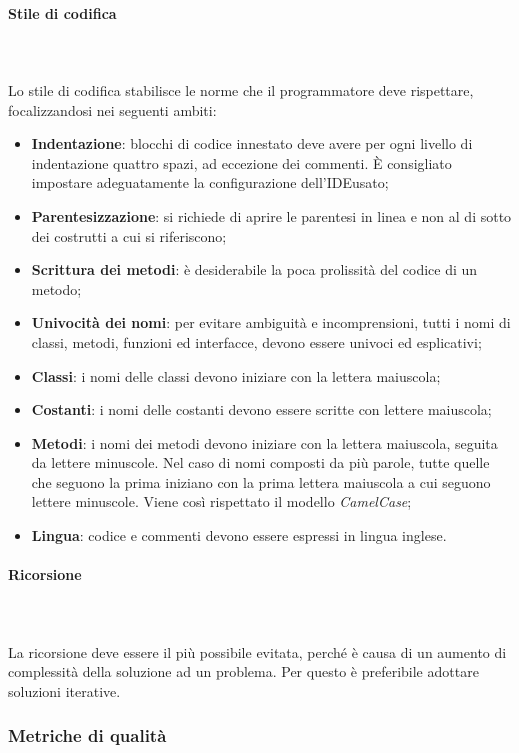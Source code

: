 		\paragraph{Stile di codifica} \mbox{} \\ \mbox{} \\
		Lo stile di codifica stabilisce le norme che il programmatore deve rispettare, focalizzandosi nei seguenti ambiti:
		\begin{itemize}
			\item \textbf{Indentazione}: blocchi di codice innestato deve avere per ogni livello di indentazione quattro spazi, ad eccezione dei commenti. È consigliato impostare adeguatamente la configurazione dell'IDE\glo usato;
			\item \textbf{Parentesizzazione}: si richiede di aprire le parentesi in linea e non al di sotto dei costrutti a cui si riferiscono;
			\item \textbf{Scrittura dei metodi}: è desiderabile la poca prolissità del codice di un metodo;
			\item \textbf{Univocità dei nomi}: per evitare ambiguità e incomprensioni, tutti i nomi di classi, metodi, funzioni ed interfacce, devono essere univoci ed esplicativi;
			\item \textbf{Classi}: i nomi delle classi devono iniziare con la lettera maiuscola;
			\item \textbf{Costanti}: i nomi delle costanti devono essere scritte con lettere maiuscola;
			\item \textbf{Metodi}: i nomi dei metodi devono iniziare con la lettera maiuscola, seguita da lettere minuscole. Nel caso di nomi composti da più parole, tutte quelle che seguono la prima iniziano con la prima lettera maiuscola a cui seguono lettere minuscole. Viene così rispettato il modello \textit{CamelCase}\glo;
			\item \textbf{Lingua}: codice e commenti devono essere espressi in lingua inglese.
		\end{itemize}
		\paragraph{Ricorsione} \mbox{} \\ \mbox{} \\
		La ricorsione deve essere il più possibile evitata, perché è causa di un aumento di complessità della soluzione ad un problema. Per questo è preferibile adottare soluzioni iterative.
	\subsubsection{Metriche di qualità}
